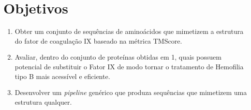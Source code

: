 \section{Objetivos}

\begin{enumerate}
  \item Obter um conjunto de sequências de aminoácidos que mimetizem a estrutura do fator de coagulação IX baseado na métrica TMScore.
  \item Avaliar, dentro do conjunto de proteínas obtidas em 1, quais possuem potencial de substituir o Fator IX de modo tornar o tratamento de Hemofilia tipo B mais acessível e eficiente.
  \item Desenvolver um \textit{pipeline} genérico que produza sequências que mimetizem uma estrutura qualquer.
\end{enumerate}

